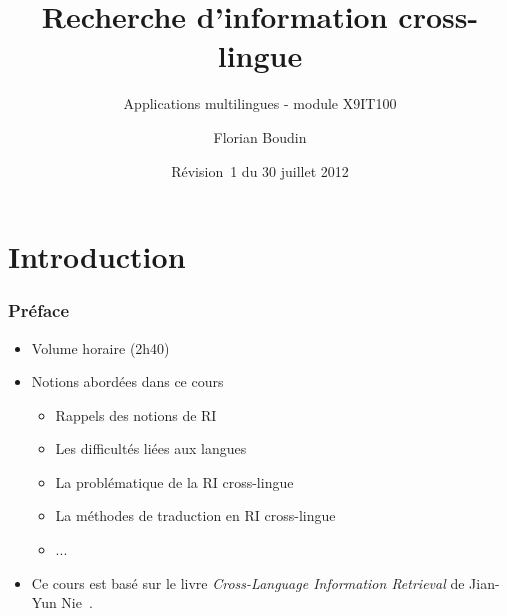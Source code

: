 \documentclass[12pt,aspectratio=43,dvipsnames,table]{beamer}
\title{Recherche d'information cross-lingue}
\subtitle{Applications multilingues - module X9IT100}
\author{Florian Boudin}
\institute{Département informatique, Université de Nantes}
\date[30 juillet 2013 / Rév.~1]{Révision~1 du 30 juillet 2012}
\begin{document}
\frame[plain]{\titlepage}


\section{Introduction}


\begin{frame}
    \frametitle{Préface}
    \begin{itemize} \itemsep10pt
        \item Volume horaire (2h40)
        \item Notions abordées dans ce cours
        \begin{itemize}
            \item Rappels des notions de RI
            \item Les difficultés liées aux langues
            \item La problématique de la RI cross-lingue
            \item La méthodes de traduction en RI cross-lingue
            \item ...
        \end{itemize}
        \item Ce cours est basé sur le livre \textit{Cross-Language Information 
              Retrieval} de Jian-Yun Nie~\cite{DBLP:series/synthesis/2010Nie}.
    \end{itemize}
\end{frame}
\end{document}
